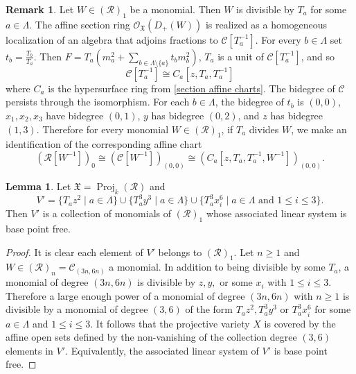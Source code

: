 \documentclass[reqno,11pt]{amsart}
\numberwithin{equation}{section}
\theoremstyle{definition}
\theoremstyle{definition}
\newtheorem{lemma}[theorem]{Lemma}
\theoremstyle{definition}
\newtheorem{remark}[theorem]{Remark}
\theoremstyle{remark}
\newcommand{\Proj}{\operatorname{Proj}}
\newcommand{\cO}{\mathcal{O}}
\begin{document}
\begin{remark}\label{Remark on charts of X}
    Let $W\in\left(\mathcal{R}\right)_1$ be a monomial. Then $W$ is divisible by $T_a$ for some $a\in\Lambda$. The affine section ring $\cO_\mathfrak{X}(D_+(W))$ is realized as a homogeneous localization of an algebra that adjoins fractions to $\mathcal{C}[T_a^{-1}]$. For every $b\in \Lambda$ set $t_b = \frac{T_b}{T_a}$. Then $F = T_a\left(m_a^2 +\sum_{b\in\Lambda\setminus\{a\}}t_bm_b^2\right)$, $T_a$ is a unit of $\mathcal{C}[T_a^{-1}]$, and so 
    \[
    \mathcal{C}[T_a^{-1}]\cong C_a\left[z,T_a,T_a^{-1}\right]
    \]
    where $C_a$ is the hypersurface ring from \cref{section affine charts}. The bidegree of $\mathcal{C}$ persists through the isomorphism. For each $b\in \Lambda$, the bidegree of $t_b$ is $(0,0)$, $x_1,x_2,x_3$ have bidegree $(0,1)$, $y$ has bidegree $(0,2)$, and $z$ has bidegree $(1,3)$. Therefore for every monomial $W\in\left(\mathcal{R}\right)_1$, if $T_a$ divides $W$, we make an identification of the corresponding affine chart
    \[
    \left(\mathcal{R}[W^{-1}]\right)_0 \cong \left(\mathcal{C}[W^{-1}]\right)_{(0,0)} \cong \left(C_a\left[z,T_a,T_a^{-1}, W^{-1}\right]\right)_{(0,0)}.
    \]
\end{remark}



\begin{lemma}
    \label{lem: An affine cover of X}
    Let $\mathfrak{X} = \Proj_{k}(\mathcal{R})$ and
    \[
    V'=\{T_az^2\mid a\in\Lambda\}\cup \{T_a^3y^3\mid a\in\Lambda\}\cup\{T_a^3x_i^6\mid a\in\Lambda\mbox{ and }1\leq i\leq 3 \}.
    \]
    Then $V'$ is a collection of monomials of $\left(\mathcal{R}\right)_1$ whose associated linear system is base point free.
\end{lemma}

\begin{proof}
    It is clear each element of $V'$ belongs to $\left(\mathcal{R}\right)_1$. Let $n\geq 1$ and $W\in \left(\mathcal{R}\right)_n = \mathcal{C}_{(3n,6n)}$ a monomial. In addition to being divisible by some $T_a$, a monomial of degree $(3n,6n)$ is divisible by $z,y,$ or some $x_i$ with $1\leq i\leq 3$. Therefore a large enough power of a monomial of degree $(3n,6n)$ with $n\geq 1$ is divisible by a monomial of degree $(3,6)$ of the form $T_az^2, T_a^3y^3$ or $T_a^3x_i^6$ for some $a\in\Lambda$ and $1\leq i\leq 3$. It follows that the projective variety $X$ is covered by the affine open sets defined by the non-vanishing of the collection degree $(3,6)$ elements in $V'$. Equivalently, the associated linear system of $V'$ is base point free.
\end{proof}
\end{document}
